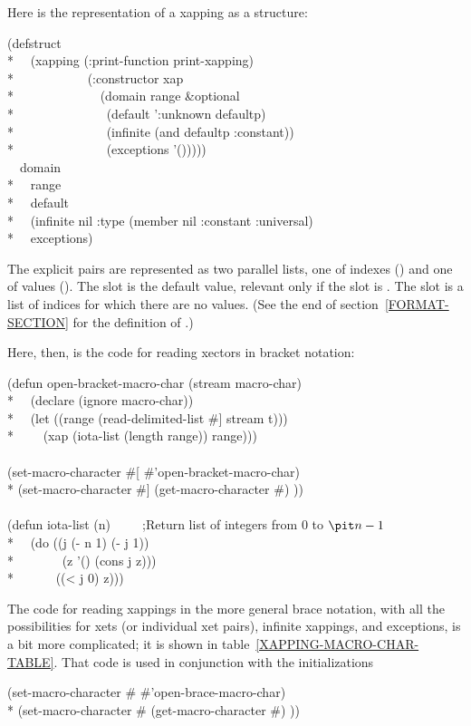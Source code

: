 \begin{defun}[Function]
\begin{new}
Here is the representation of a xapping as a structure:
\begin{lisp}
(defstruct \\*
~~(xapping (:print-function print-xapping) \\*
~~~~~~~~~~~(:constructor xap \\*
~~~~~~~~~~~~~(domain range \&optional \\*
~~~~~~~~~~~~~~(default ':unknown defaultp) \\*
~~~~~~~~~~~~~~(infinite (and defaultp :constant)) \\*
~~~~~~~~~~~~~~(exceptions '())))) \\
~~domain \\*
~~range \\*
~~default \\*
~~(infinite nil :type (member nil :constant :universal) \\*
~~exceptions)
\end{lisp}
The explicit pairs are represented as two parallel lists, one of indexes ()
and one of values ().  The  slot is the default value, relevant
only if the  slot is .
The  slot is a list of indices for which there are no values.
(See the end of section~\ref{FORMAT-SECTION} for the definition of .)

Here, then, is the code for reading xectors in bracket notation:
\begin{lisp}
(defun open-bracket-macro-char (stream macro-char) \\*
~~(declare (ignore macro-char)) \\*
~~(let ((range (read-delimited-list \#{\Xbackslash}] stream t))) \\*
~~~~(xap (iota-list (length range)) range))) \\
 \\
(set-macro-character \#{\Xbackslash}[ \#'open-bracket-macro-char) \\*
(set-macro-character \#{\Xbackslash}] (get-macro-character \#{\Xbackslash}) )) \\
 \\
(defun iota-list (n)~~~~~;{\rm Return list of integers from $0$ to ${\it n}-1$}\\*
~~(do ((j (- n 1) (- j 1)) \\*
~~~~~~~(z '() (cons j z))) \\*
~~~~~~((< j 0) z)))
\end{lisp}
The code for reading xappings in the more general brace notation, with all the
possibilities for xets (or individual xet pairs), infinite xappings, and exceptions,
is a bit more complicated; it is shown in table~\ref{XAPPING-MACRO-CHAR-TABLE}.
That code is used in conjunction with the initializations
\begin{lisp}
(set-macro-character \#{\Xbackslash}{\Xlbrace} \#'open-brace-macro-char) \\*
(set-macro-character \#{\Xbackslash}{\Xrbrace} (get-macro-character \#{\Xbackslash}) ))
\end{lisp}
\end{new}
\end{defun}


